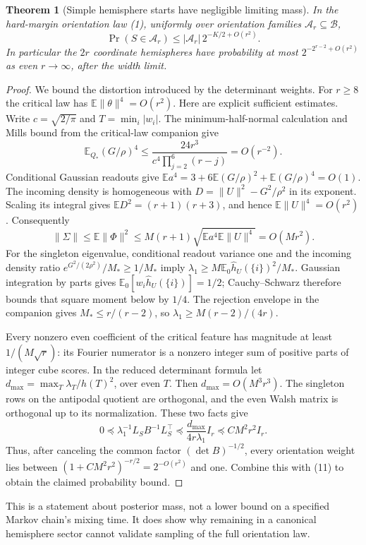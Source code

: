 \documentclass[11pt]{article}
\newtheorem{theorem}{Theorem}\newtheorem{lemma}[theorem]{Lemma}
\newcommand{\E}{\mathbb E}\newcommand{\R}{\mathbb R}
\begin{document}
\begin{theorem}[Simple hemisphere starts have negligible limiting mass]
In the hard-margin orientation law (1), uniformly over orientation
families $\mathcal A_r\subseteq\mathcal B$,
\[
 \Pr(S\in\mathcal A_r)\le |\mathcal A_r|\,
                        2^{-K/2+O(r^2)}.
\]
In particular the $2r$ coordinate hemispheres have probability at most
$2^{-2^{r-2}+O(r^2)}$ as even $r\to\infty$, after the width limit.
\end{theorem}
\begin{proof}
We bound the distortion introduced by the determinant weights. For
$r\ge8$ the critical law has $\E\|\theta\|^4=O(r^2)$.
Here are explicit sufficient estimates. Write $c=\sqrt{2/\pi}$ and
$T=\min_i|w_i|$. The minimum-half-normal calculation and Mills bound
from the critical-law companion give
\[
 \E_{Q_*}(G/\rho)^4
 \le \frac{24r^3}{c^4\prod_{j=2}^6(r-j)}=O(r^{-2}).
\]
Conditional Gaussian readouts give
$\E a^4=3+6\E(G/\rho)^2+\E(G/\rho)^4=O(1)$.
The incoming density is homogeneous with
$D=\|U\|^2-G^2/\rho^2$ in its exponent. Scaling its integral gives
$\E D^2=(r+1)(r+3)$, and hence $\E\|U\|^4=O(r^2)$.
Consequently
\[
 \|\Sigma\|\le\E\|\Phi\|^2
 \le M(r+1)\sqrt{\E a^4\E\|U\|^4}=O(Mr^2).
\]
For the singleton eigenvalue, conditional readout variance one and the
incoming density ratio $e^{G^2/(2\rho^2)}/M_*\ge1/M_*$ imply
$\lambda_1\ge M\E_0\widehat h_U(\{i\})^2/M_*$.
Gaussian integration by parts gives
$\E_0[w_i\widehat h_U(\{i\})]=1/2$; Cauchy--Schwarz therefore
bounds that square moment below by $1/4$. The rejection envelope in
the companion gives $M_*\le r/(r-2)$, so $\lambda_1\ge M(r-2)/(4r)$.

Every nonzero even coefficient of the critical feature has magnitude
at least $1/(M\sqrt r)$: its Fourier numerator is a nonzero integer
sum of positive parts of integer cube scores. In the reduced determinant
formula let $d_{\max}=\max_T\lambda_T/\widehat h(T)^2$, over even $T$.
Then $d_{\max}=O(M^3r^3)$. The singleton rows on the antipodal quotient
are orthogonal, and the even Walsh matrix is orthogonal up to its
normalization. These two facts give
\[
 0\preceq\lambda_1^{-1}L_SB^{-1}L_S^\top
       \preceq\frac{d_{\max}}{4r\lambda_1}I_r
       \preceq C M^2r^2I_r.
\]
Thus, after canceling the common factor $(\det B)^{-1/2}$, every
orientation weight lies between
$(1+CM^2r^2)^{-r/2}=2^{-O(r^2)}$ and one. Combine this with (11) to
obtain the claimed probability bound.
\end{proof}
This is a statement about posterior mass, not a lower bound on a specified
Markov chain's mixing time. It does show why remaining in a canonical
hemisphere sector cannot validate sampling of the full orientation law.
\end{document}
